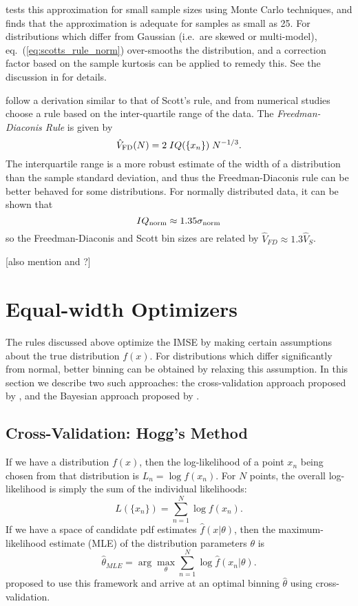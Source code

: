 \documentclass[12pt]{article}
\newcommand{\comment}[1]{{\color{blue} [#1]}}
\newcommand{\eqn}[1]{eq.~(\ref{eq:#1})}
\begin{document}
\citet{Scott1979} tests this approximation for small sample sizes using Monte
Carlo techniques, and finds that the approximation is adequate for samples
as small as 25.  For distributions which differ from Gaussian (i.e.\ are
skewed or multi-model), \eqn{scotts_rule_norm} over-smooths the
distribution, and a correction factor based on the sample kurtosis can
be applied to remedy this.  See
the discussion in \citet{Scott1979} for details.

\citet{Freedman1981} follow a derivation similar to that of Scott's rule,
and from numerical studies choose a rule based on the
inter-quartile range of the data.  The {\it Freedman-Diaconis Rule} is
given by
\begin{equation}
  \hat{V}_{\rm FD}(N) = 2\; IQ(\{x_n\})\; N^{-1/3}.
\end{equation}
The interquartile range is a more robust estimate of the width of a
distribution than the sample standard deviation, and thus the Freedman-Diaconis
rule can be better behaved for some distributions.  For normally distributed
data, it can be shown that
\begin{equation}
  IQ_{\rm norm} \approx 1.35 \sigma_{\rm norm}
\end{equation}
\citep[see, e.g.][]{Ivezic2013} so the Freedman-Diaconis and Scott bin sizes
are related by $\hat{V}_{FD} \approx 1.3 \hat{V}_{S}$.

\comment{also mention \citet{Stone1984} and \citet{Rudemo1982}?}


\section{Equal-width Optimizers}
\label{sec:equal_width}
The rules discussed above optimize the IMSE by making certain assumptions
about the true distribution $f(x)$.  For distributions which differ
significantly from normal, better binning can be obtained by relaxing this
assumption. In this section we describe two such approaches: the
cross-validation approach proposed by \citet{Hogg2008}, and the Bayesian
approach proposed by \citet{Knuth2006}.

\subsection{Cross-Validation: Hogg's Method}
If we have a distribution $f(x)$, then the log-likelihood of a point $x_n$
being chosen from that distribution is $L_n = \log f(x_n)$.  For $N$ points,
the overall log-likelihood is simply the sum of the individual likelihoods:
\begin{equation}
  L(\{x_n\}) = \sum_{n=1}^N \log f(x_n).
\end{equation}
If we have a space of candidate pdf estimates $\hat{f}(x|\theta)$,
then the maximum-likelihood estimate (MLE) of the distribution
parameters $\theta$ is
\begin{equation}
  \hat{\theta}_{MLE} = \arg\max_\theta \sum_{n=1}^N \log \hat{f}(x_n|\theta).
\end{equation}
\citet{Hogg2008} proposed to use this framework and arrive at an optimal
binning $\hat{\theta}$ using cross-validation.
\end{document}
